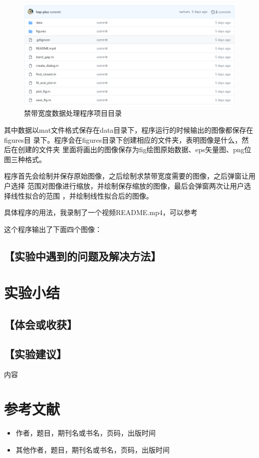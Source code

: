 \documentclass{ctexart}
\let\oldsubsection\subsection
\renewcommand{\subsection}[1]{\oldsubsection{\!\!\!\!\!\!【#1】}}
\begin{document}
\begin{figure}[H]
  \centering
  \includegraphics[width=\linewidth]{figures/禁带宽度数据处理程序}
  \caption{禁带宽度数据处理程序项目目录}
\end{figure}

其中数据以mat文件格式保存在data目录下，程序运行的时候输出的图像都保存在figures目
录下。程序会在figures目录下创建相应的文件夹，表明图像是什么，然后在创建的文件夹
里面将画出的图像保存为fig绘图原始数据、eps矢量图、png位图三种格式。

程序首先会绘制并保存原始图像，之后绘制求禁带宽度需要的图像，之后弹窗让用户选择
范围对图像进行缩放，并绘制保存缩放的图像，最后会弹窗两次让用户选择线性拟合的范围
，并绘制线性拟合后的图像。

具体程序的用法，我录制了一个视频README.mp4，可以参考

这个程序输出了下面四个图像：


\subsection{实验中遇到的问题及解决方法}



\section{实验小结}
\subsection{体会或收获}
\subsection{实验建议}
内容
\section{参考文献}
\begin{itemize}[leftmargin=0pt]
  \item[] 作者，题目，期刊名或书名，页码，出版时间
  \item[] 其他作者，题目，期刊名或书名，页码，出版时间
\end{itemize}
\end{document}
